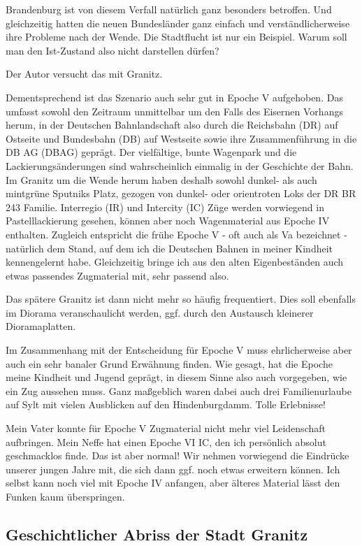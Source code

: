 Brandenburg ist von diesem Verfall nat\"urlich ganz besonders betroffen.
Und gleichzeitig hatten die neuen Bundesl\"ander ganz einfach und verst\"andlicherweise ihre Probleme nach der Wende.
Die Stadtflucht ist nur ein Beispiel.
Warum soll man den Ist-Zustand also nicht darstellen d\"urfen?

Der Autor versucht das mit Granitz.

Dementsprechend ist das Szenario auch sehr gut in Epoche V aufgehoben.
Das umfasst sowohl den Zeitraum unmittelbar um den Falls des Eisernen Vorhangs herum, in der Deutschen Bahnlandschaft also durch die Reichsbahn (DR) auf Ostseite und Bundesbahn (DB) auf Westseite sowie ihre Zusammenf\"uhrung in die DB AG (DBAG) gepr\"agt.
Der vielf\"altige, bunte Wagenpark und die Lackierungs\"anderungen sind wahrscheinlich einmalig in der Geschichte der Bahn.
Im Granitz um die Wende herum haben deshalb sowohl dunkel- als auch mintgr\"une Sputniks Platz, gezogen von dunkel- oder orientroten Loks der DR BR 243 Familie.
Interregio (IR) und Intercity (IC) Z\"uge werden vorwiegend in Pastelllackierung gesehen, k\"onnen aber noch Wagenmaterial aus Epoche IV enthalten.
Zugleich entspricht die fr\"uhe Epoche V - oft auch als Va bezeichnet - nat\"urlich dem Stand, auf dem ich die Deutschen Bahnen in meiner Kindheit kennengelernt habe.
Gleichzeitig bringe ich aus den alten Eigenbest\"anden auch etwas passendes Zugmaterial mit, sehr passend also.

Das sp\"atere Granitz ist dann nicht mehr so h\"aufig frequentiert.
Dies soll ebenfalls im Diorama veranschaulicht werden, ggf. durch den Austausch kleinerer Dioramaplatten.

Im Zusammenhang mit der Entscheidung f\"ur Epoche V muss ehrlicherweise aber auch ein sehr banaler Grund Erw\"ahnung finden.
Wie gesagt, hat die Epoche meine Kindheit und Jugend gepr\"agt, in diesem Sinne also auch vorgegeben, wie ein Zug aussehen muss.
Ganz ma{\ss}geblich waren dabei auch drei Familienurlaube auf Sylt mit vielen Ausblicken auf den Hindenburgdamm.
Tolle Erlebnisse!

Mein Vater konnte f\"ur Epoche V Zugmaterial nicht mehr viel Leidenschaft aufbringen.
Mein Neffe hat einen Epoche VI IC, den ich pers\"onlich absolut geschmacklos finde.
Das ist aber normal!
Wir nehmen vorwiegend die Eindr\"ucke unserer jungen Jahre mit, die sich dann ggf. noch etwas erweitern k\"onnen.
Ich selbst kann noch viel mit Epoche IV anfangen, aber \"alteres Material l\"asst den Funken kaum \"uberspringen.


\subsection{Geschichtlicher Abriss der Stadt Granitz}
\label{sec:storyOfGranitz}


